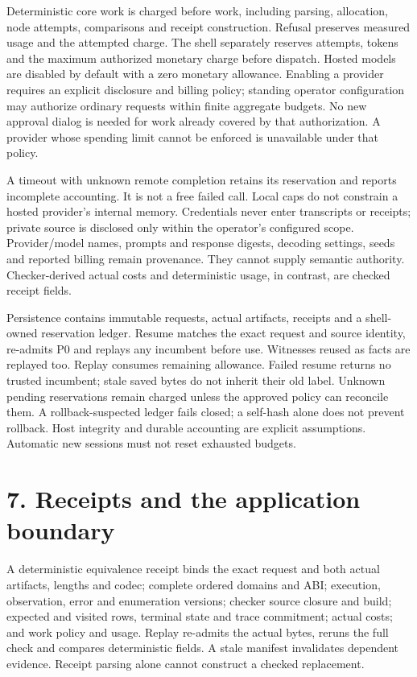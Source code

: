\documentclass[11pt]{article}
\begin{document}
Deterministic core work is charged before work, including parsing, allocation, node attempts, comparisons and receipt construction. Refusal preserves measured usage and the attempted charge. The shell separately reserves attempts, tokens and the maximum authorized monetary charge before dispatch. Hosted models are disabled by default with a zero monetary allowance. Enabling a provider requires an explicit disclosure and billing policy; standing operator configuration may authorize ordinary requests within finite aggregate budgets. No new approval dialog is needed for work already covered by that authorization. A provider whose spending limit cannot be enforced is unavailable under that policy.

A timeout with unknown remote completion retains its reservation and reports incomplete accounting. It is not a free failed call. Local caps do not constrain a hosted provider's internal memory. Credentials never enter transcripts or receipts; private source is disclosed only within the operator's configured scope. Provider/model names, prompts and response digests, decoding settings, seeds and reported billing remain provenance. They cannot supply semantic authority. Checker-derived actual costs and deterministic usage, in contrast, are checked receipt fields.

Persistence contains immutable requests, actual artifacts, receipts and a shell-owned reservation ledger. Resume matches the exact request and source identity, re-admits P0 and replays any incumbent before use. Witnesses reused as facts are replayed too. Replay consumes remaining allowance. Failed resume returns no trusted incumbent; stale saved bytes do not inherit their old label. Unknown pending reservations remain charged unless the approved policy can reconcile them. A rollback-suspected ledger fails closed; a self-hash alone does not prevent rollback. Host integrity and durable accounting are explicit assumptions. Automatic new sessions must not reset exhausted budgets.

\section{7. Receipts and the application boundary}

A deterministic equivalence receipt binds the exact request and both actual artifacts, lengths and codec; complete ordered domains and ABI; execution, observation, error and enumeration versions; checker source closure and build; expected and visited rows, terminal state and trace commitment; actual costs; and work policy and usage. Replay re-admits the actual bytes, reruns the full check and compares deterministic fields. A stale manifest invalidates dependent evidence. Receipt parsing alone cannot construct a checked replacement.
\end{document}
